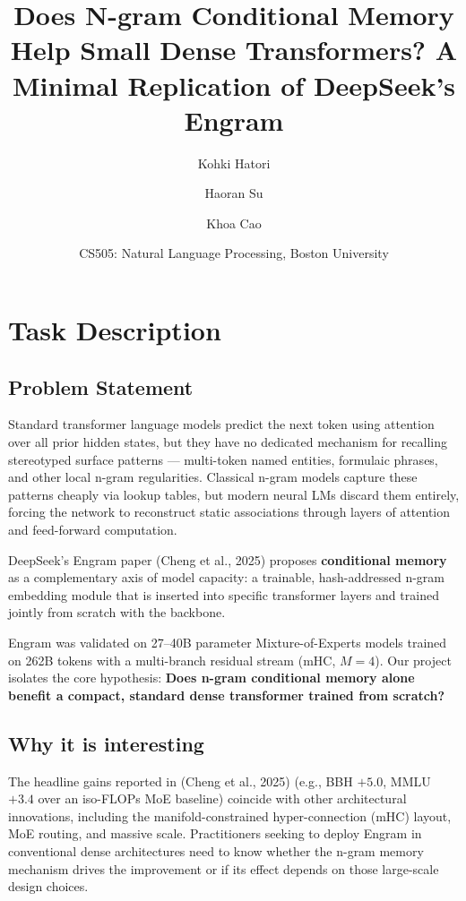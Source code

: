 \documentclass[11pt]{article}
\title{Does N-gram Conditional Memory Help Small Dense Transformers? A Minimal Replication of DeepSeek's Engram}
\author{Kohki Hatori \and Haoran Su \and Khoa Cao}
\date{CS505: Natural Language Processing, Boston University}
\begin{document}
\maketitle

\section{Task Description}
\subsection{Problem Statement}

Standard transformer language models predict the next token using attention over all prior hidden states, but they have no dedicated mechanism for recalling stereotyped surface patterns — multi-token named entities, formulaic phrases, and other local n-gram regularities. Classical n-gram models capture these patterns cheaply via lookup tables, but modern neural LMs discard them entirely, forcing the network to reconstruct static associations through layers of attention and feed-forward computation.

DeepSeek's Engram paper (Cheng et al., 2025) proposes \textbf{conditional memory} as a complementary axis of model capacity: a trainable, hash-addressed n-gram embedding module that is inserted into specific transformer layers and trained jointly from scratch with the backbone.

Engram was validated on 27--40B parameter Mixture-of-Experts models trained on 262B tokens with a multi-branch residual stream (mHC, $M=4$). Our project isolates the core hypothesis: \textbf{Does n-gram conditional memory alone benefit a compact, standard dense transformer trained from scratch?}

\subsection{Why it is interesting}
The headline gains reported in (Cheng et al., 2025) (e.g., BBH $+5.0$, MMLU $+3.4$ over an iso-FLOPs MoE baseline) coincide with other architectural innovations, including the manifold-constrained hyper-connection (mHC) layout, MoE routing, and massive scale. Practitioners seeking to deploy Engram in conventional dense architectures need to know whether the n-gram memory mechanism drives the improvement or if its effect depends on those large-scale design choices.
\end{document}
